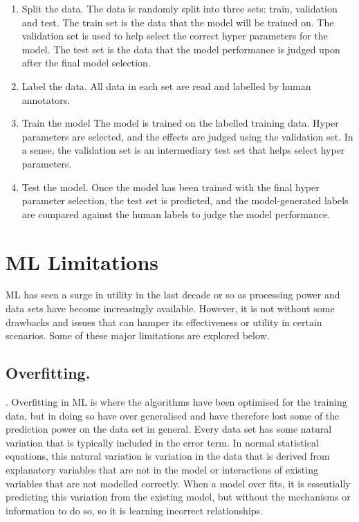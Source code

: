 \begin{enumerate}
\item{Split the data.} The data is randomly split into three sets: train, validation and test. The train set is the data that the model will be trained on. The validation set is used to help select the correct hyper parameters for the model. The test set is the data that the model performance is judged upon after the final model selection.
\item{Label the data.} All data in each set are read and labelled by human annotators.
\item{Train the model} The model is trained on the labelled training data. Hyper parameters are selected, and the effects are judged using the validation set. In a sense, the validation set is an intermediary test set that helps select hyper parameters.
\item{Test the model.} Once the model has been trained with the final hyper parameter selection, the test set is predicted, and the model-generated labels are compared against the human labels to judge the model performance.
\end{enumerate}

\section{ML Limitations} ML has seen a surge in utility in the last decade or so as processing power and data sets have become increasingly available. However, it is not without some drawbacks and issues that can hamper its effectiveness or utility in certain scenarios. Some of these major limitations are explored below.




\subsection{Overfitting.} \parencite{chollet_allaire_2018}. Overfitting in ML is where the algorithms have been optimised for the training data, but in doing so have over generalised and have therefore lost some of the prediction power on the data set in general. Every data set has some natural variation that is typically included in the error term. In normal statistical equations, this natural variation is variation in the data that is derived from explanatory variables that are not in the model or interactions of existing variables that are not modelled correctly. When a model over fits, it is essentially predicting this variation from the existing model, but without the mechanisms or information to do so, so it is learning incorrect relationships.  

